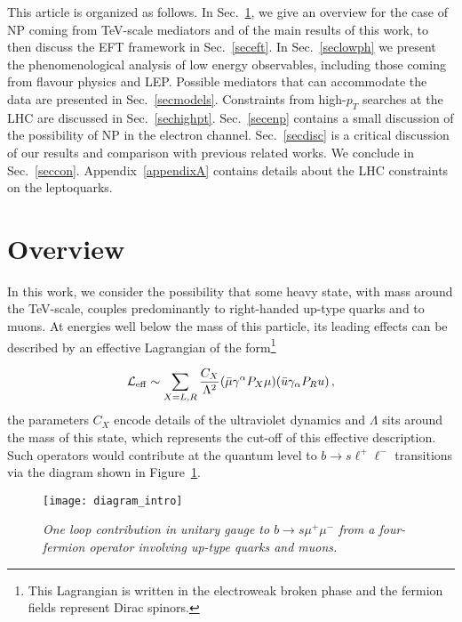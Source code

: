 \documentclass[aps,twocolumn,showpacs,preprintnumbers,amsmath,amssymb,floatfix,nofootinbib]{revtex4-1}
\begin{document}
This article is organized as follows. In Sec.~\ref{secov}, we give an overview for the case of NP coming from TeV-scale mediators and of the main results of this work, to then  discuss the EFT framework in Sec.~\ref{seceft}.   In Sec.~\ref{seclowph} we present the phenomenological analysis of low energy observables, including those coming from flavour physics and LEP.   Possible mediators that can accommodate the data are presented in Sec.~\ref{secmodels}.   Constraints from high-$p_T$ searches at the LHC are discussed in Sec.~\ref{sechighpt}.  Sec.~\ref{secenp} contains a small discussion of the possibility of NP in the electron channel.    Sec.~\ref{secdisc}  is a critical discussion of our results and comparison with previous related works. We conclude in Sec.~\ref{seccon}.  Appendix~\ref{appendixA} contains details about the LHC constraints on the leptoquarks.  





\section{Overview}\label{secov}  

In this work, we consider the possibility that some heavy state, with mass around the TeV-scale, couples predominantly to right-handed up-type quarks and to muons.     At energies well below the mass of this particle, its leading effects can be described by an effective Lagrangian of the form\footnote{This Lagrangian is written in the electroweak broken phase and the fermion fields represent Dirac spinors.}

 \begin{align} \label{eqov}
\mathcal{L}_{\rm{eff}} \sim \sum_{X=L,R} \frac{C_{X}}{\Lambda^2} (\bar \mu \gamma^{\alpha}  P_{X} \mu) (\bar u  \gamma_{\alpha}  P_R  u  )  \,,
 \end{align}
the parameters $C_{X}$ encode details of the ultraviolet dynamics and $\Lambda$ sits around the mass of this state, which represents the cut-off of this effective description.    Such operators would contribute at the quantum level to ${b \to s \ell^+ \ell^-}$ transitions via the diagram shown in Figure~\ref{figintro}.  
 
\begin{figure}[h]
\begin{center}{
\texttt{[image: diagram\_intro]}
\caption{\textit{One loop contribution in unitary gauge to $b \to s \mu^+ \mu^-$ from a four-fermion operator involving up-type quarks and muons.}\label{figintro}} }
\end{center}
\end{figure}
%
\end{document}
